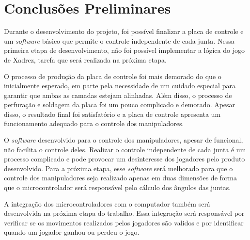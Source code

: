 \chapter[Conclusões Preliminares]{Conclusões Preliminares}
\label{cap:conclusoes}

Durante o desenvolvimento do projeto, foi possível finalizar a placa de controle e um \textit{software} básico que permite o controle independente de cada junta.
Nessa primeira etapa de desenvolvimento, não foi possível implementar a lógica do jogo de Xadrez, tarefa que será realizada na próxima etapa.

O processo de produção da placa de controle foi mais demorado do que o inicialmente esperado, em parte pela necessidade de um cuidado especial para garantir que ambas as camadas estejam alinhadas.
Além disso, o processo de perfuração e soldagem da placa foi um pouco complicado e demorado.
Apesar disso, o resultado final foi satisfatório e a placa de controle apresenta um funcionamento adequado para o controle dos manipuladores.

O \textit{software} desenvolvido para o controle dos manipuladores, apesar de funcional, não facilita o controle deles.
Realizar o controle independente de cada junta é um processo complicado e pode provocar um desinteresse dos jogadores pelo produto desenvolvido.
Para a próxima etapa, esse \textit{software} será melhorado para que o controle dos manipuladores seja realizado apenas em duas dimensões de forma que o microcontrolador será responsável pelo cálculo dos ângulos das juntas.

A integração dos microcontroladores com o computador também será desenvolvida na próxima etapa do trabalho.
Essa integração será responsável por verificar se os movimentos realizados pelos jogadores são validos e por identificar quando um jogador ganhou ou perdeu o jogo.